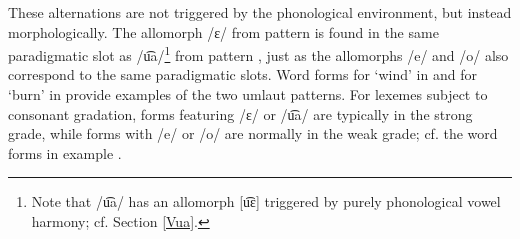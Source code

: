 These alternations are not triggered by the phonological environment, but instead morphologically. 
The allomorph /ɛ/ from pattern  is found in the same paradigmatic slot as /u͡a/\footnote{Note that /u͡a/ has an allomorph [u͡ɛ] triggered by purely phonological vowel harmony; cf. Section \ref{Vua}.} 
from pattern , just as the allomorphs /e/ and /o/ also correspond to the same paradigmatic slots. 
Word forms for  ‘wind’ in  and for  ‘burn’ in  provide examples of the two umlaut patterns.
\ea\label{umlautEx1}%
\z
%
\ea\label{umlautEx2}%
\Tn{\begin{tabular}{c c}
/p\Bf{u͡a}lːta/		&/p\Bf{o}lta/\\
\It{buallda}		&\It{buolda}\\
ignite\BS\Sc{3sg.prs}	&ignite\BS\Sc{2sg.prs}\\
\end{tabular}
\hfill\hyperlink{pit101208}{{\small [pit101208]}}}
\z
For lexemes subject to consonant gradation, forms featuring /ɛ/ or /u͡a/ are typically in the strong grade, while forms with /e/ or /o/ are normally in the weak grade; cf. the word forms in example . 


